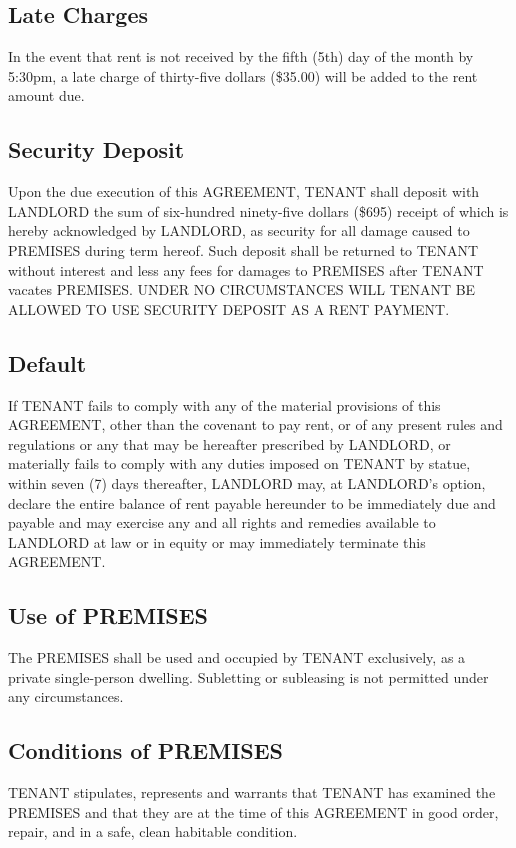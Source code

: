 \documentclass[11pt]{article}
\begin{document}
\subsection{Late Charges}
\label{sec:orgddc80f4}
In the event that rent is not received by the fifth (5th) day of the
month by 5:30pm, a late charge of thirty-five dollars (\$35.00) will be
added to the rent amount due.

\subsection{Security Deposit}
\label{sec:orgb62c99d}
Upon the due execution of this AGREEMENT, TENANT shall deposit with
LANDLORD the sum of six-hundred ninety-five dollars (\$695) receipt of
which is hereby acknowledged by LANDLORD, as security for all damage
caused to PREMISES during term hereof. Such deposit shall be returned
to TENANT without interest and less any fees for damages to PREMISES
after TENANT vacates PREMISES.  UNDER NO CIRCUMSTANCES WILL TENANT BE
ALLOWED TO USE SECURITY DEPOSIT AS A RENT PAYMENT.
\subsection{Default}
\label{sec:orgdae119d}
If TENANT fails to comply with any of the material provisions of this
AGREEMENT, other than the covenant to pay rent, or of any present
rules and regulations or any that may be hereafter prescribed by
LANDLORD, or materially fails to comply with any duties imposed on
TENANT by statue, within seven (7) days thereafter, LANDLORD may, at
LANDLORD's option, declare the entire balance of rent payable
hereunder to be immediately due and payable and may exercise any and
all rights and remedies available to LANDLORD at law or in equity or
may immediately terminate this AGREEMENT.

\subsection{Use of PREMISES}
\label{sec:orgd14d7f6}
The PREMISES shall be used and occupied by TENANT exclusively, as a
private single-person dwelling.  Subletting or subleasing is not
permitted under any circumstances.

\subsection{Conditions of PREMISES}
\label{sec:org26e84c0}
TENANT stipulates, represents and warrants that TENANT has examined
the PREMISES and that they are at the time of this AGREEMENT in good
order, repair, and in a safe, clean habitable condition.
\end{document}
